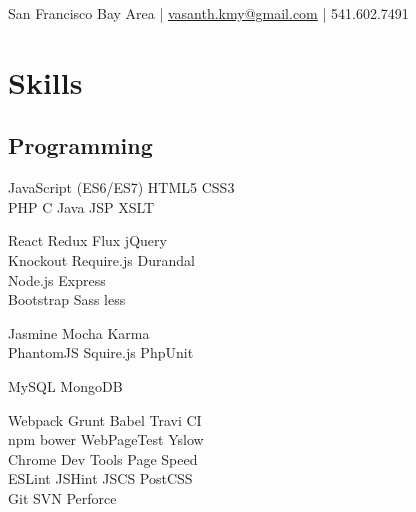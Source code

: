 \documentclass[]{my-resume-openfont}
\begin{document}
%
%

{ San Francisco Bay Area | \href{mailto:vasanth.kmy@gmail.com}{vasanth.kmy@gmail.com} | 541.602.7491 \\
}

%
%

\begin{minipage}[t]{0.33\textwidth} 


\section{Skills}
\subsection{Programming}
JavaScript (ES6/ES7) \textbullet{} HTML5 \textbullet{} CSS3 \\
PHP \textbullet{} C \textbullet{} Java \textbullet{} JSP \textbullet{} XSLT \\
\sectionsep

React \textbullet{} Redux \textbullet{} Flux \textbullet{} jQuery \\ 
Knockout \textbullet{} Require.js \textbullet{} Durandal \\
Node.js \textbullet{} Express \\
Bootstrap \textbullet{} Sass \textbullet{} less \\
\sectionsep

Jasmine \textbullet{} Mocha \textbullet{} Karma \\
PhantomJS \textbullet{} Squire.js \textbullet{} PhpUnit
\sectionsep

MySQL \textbullet{} MongoDB \\
\sectionsep

Webpack \textbullet{} Grunt \textbullet{} Babel \textbullet{} Travi CI \\ 
npm \textbullet{} bower \textbullet{} WebPageTest \textbullet{} Yslow \\
Chrome Dev Tools \textbullet{} Page Speed \\
ESLint \textbullet{} JSHint \textbullet{} JSCS \textbullet{} PostCSS \\
Git \textbullet{} SVN \textbullet{} Perforce
\sectionsep


\end{minipage}
\end{document}
